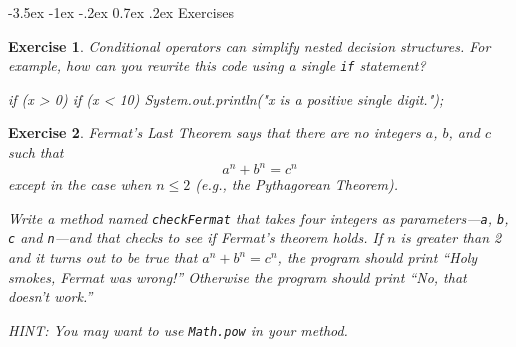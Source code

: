 \documentclass[12pt]{book}
\makeatletter
\theoremstyle{exercise}
\newtheorem{exercise}{Exercise}[chapter]
\newcommand{\java}[1]{\verb"#1"}
\renewcommand{\section}{\@startsection {section}{1}{\z@}%
    {-3.5ex \@plus -1ex \@minus -.2ex}%
    {0.7ex \@plus.2ex}%
    {\normalfont\Large\bfseries}}
\newcommand{\java}[1]{\lstinline{#1}} %
\makeatother
\begin{document}
\section{Exercises}


\begin{exercise}

Conditional operators can simplify nested decision structures.
For example, how can you rewrite this code using a single \java{if} statement?

\begin{code}
    if (x > 0) {
        if (x < 10) {
            System.out.println("x is a positive single digit.");
        }
    }
\end{code}

\end{exercise}


\begin{exercise}

Fermat's Last Theorem says that there are no integers $a$, $b$, and $c$ such that
\[ a^n + b^n = c^n \]
except in the case when $n \leq 2$ (e.g., the Pythagorean Theorem).

Write a method named \java{checkFermat} that takes four integers as parameters---\java{a}, \java{b}, \java{c} and \java{n}---and that checks to see if Fermat's theorem holds.
If $n$ is greater than 2 and it turns out to be true that $a^n + b^n = c^n$, the program should print ``Holy smokes, Fermat was wrong!''
Otherwise the program should print ``No, that doesn't work.''

HINT: You may want to use \java{Math.pow} in your method.

\end{exercise}
\end{document}
